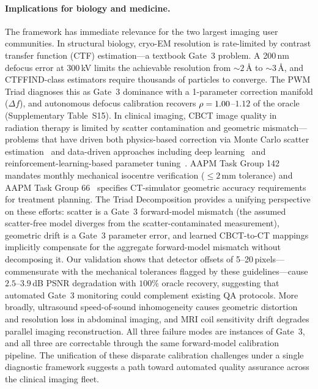 \paragraph{Implications for biology and medicine.}
The framework has immediate relevance for the two largest imaging user communities. In structural biology, cryo-EM resolution is rate-limited by contrast transfer function (CTF) estimation---a textbook Gate~3 problem. A 200\,nm defocus error at 300\,kV limits the achievable resolution from ${\sim}2$\,\AA{} to ${\sim}3$\,\AA{}, and CTFFIND-class estimators require thousands of particles to converge. The PWM Triad diagnoses this as Gate~3 dominance with a 1-parameter correction manifold ($\Delta f$), and autonomous defocus calibration recovers $\rho = 1.00$--$1.12$ of the oracle (Supplementary Table~S15). In clinical imaging, CBCT image quality in radiation therapy is limited by scatter contamination and geometric mismatch---problems that have driven both physics-based correction via Monte Carlo scatter estimation~\cite{xu2015cbct} and data-driven approaches including deep learning~\cite{liang2019cyclegan} and reinforcement-learning-based parameter tuning~\cite{shen2018drl}. AAPM Task Group 142~\cite{klein2009tg142} mandates monthly mechanical isocentre verification ($\leq 2$\,mm tolerance) and AAPM Task Group 66~\cite{mutic2003tg66} specifies CT-simulator geometric accuracy requirements for treatment planning. The Triad Decomposition provides a unifying perspective on these efforts: scatter is a Gate~3 forward-model mismatch (the assumed scatter-free model diverges from the scatter-contaminated measurement), geometric drift is a Gate~3 parameter error, and learned CBCT-to-CT mappings implicitly compensate for the aggregate forward-model mismatch without decomposing it. Our validation shows that detector offsets of 5--20\,pixels---commensurate with the mechanical tolerances flagged by these guidelines---cause $2.5$--$3.9$\,dB PSNR degradation with $100\%$ oracle recovery, suggesting that automated Gate~3 monitoring could complement existing QA protocols. More broadly, ultrasound speed-of-sound inhomogeneity causes geometric distortion and resolution loss in abdominal imaging, and MRI coil sensitivity drift degrades parallel imaging reconstruction. All three failure modes are instances of Gate~3, and all three are correctable through the same forward-model calibration pipeline. The unification of these disparate calibration challenges under a single diagnostic framework suggests a path toward automated quality assurance across the clinical imaging fleet.

